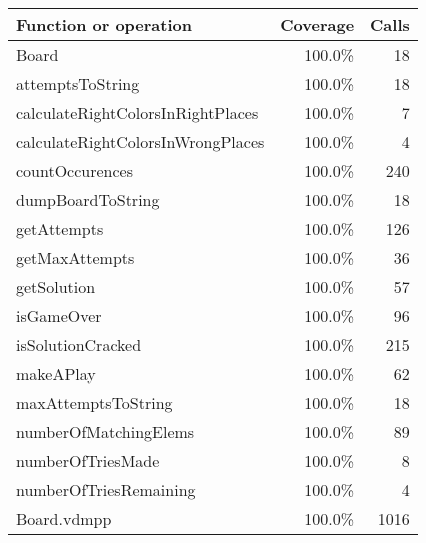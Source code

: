 \begin{longtable}{|l|r|r|}
\hline
Function or operation & Coverage & Calls \\
\hline
\hline
Board & 100.0\% & 18 \\
\hline
attemptsToString & 100.0\% & 18 \\
\hline
calculateRightColorsInRightPlaces & 100.0\% & 7 \\
\hline
calculateRightColorsInWrongPlaces & 100.0\% & 4 \\
\hline
countOccurences & 100.0\% & 240 \\
\hline
dumpBoardToString & 100.0\% & 18 \\
\hline
getAttempts & 100.0\% & 126 \\
\hline
getMaxAttempts & 100.0\% & 36 \\
\hline
getSolution & 100.0\% & 57 \\
\hline
isGameOver & 100.0\% & 96 \\
\hline
isSolutionCracked & 100.0\% & 215 \\
\hline
makeAPlay & 100.0\% & 62 \\
\hline
maxAttemptsToString & 100.0\% & 18 \\
\hline
numberOfMatchingElems & 100.0\% & 89 \\
\hline
numberOfTriesMade & 100.0\% & 8 \\
\hline
numberOfTriesRemaining & 100.0\% & 4 \\
\hline
\hline
Board.vdmpp & 100.0\% & 1016 \\
\hline
\end{longtable}

